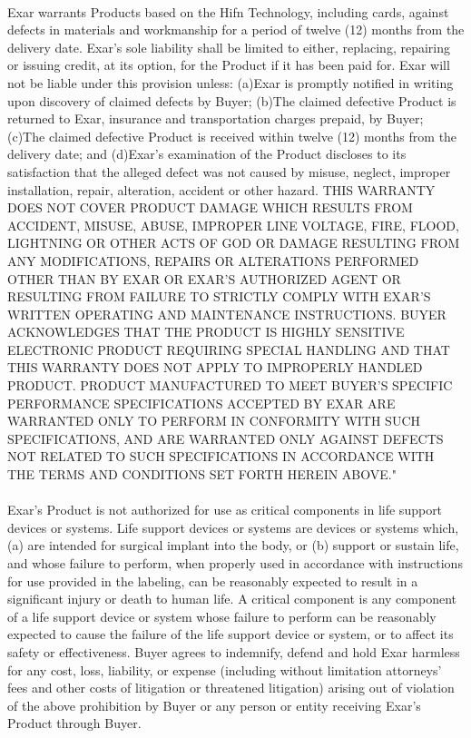 {  \noindent{\small\textbf{\textcolor{ThemeColor}{Limited Warranty}}}\\[.5ex]

  {\scriptsize\noindent{}Exar warrants Products based on the Hifn Technology, including cards,
  against defects in materials and workmanship for a period of twelve
  (12) months from the delivery date. Exar's sole liability shall be
  limited to either, replacing, repairing or issuing credit, at its
  option, for the Product if it has been paid for.  Exar will not be
  liable under this provision unless: (a)Exar is promptly notified in
  writing upon discovery of claimed defects by Buyer; (b)The claimed
  defective Product is returned to Exar, insurance and transportation
  charges prepaid, by Buyer; (c)The claimed defective Product is
  received within twelve (12) months from the delivery date; and
  (d)Exar's examination of the Product discloses to its satisfaction
  that the alleged defect was not caused by misuse, neglect, improper
  installation, repair, alteration, accident or other hazard. THIS
  WARRANTY DOES NOT COVER PRODUCT DAMAGE WHICH RESULTS FROM ACCIDENT,
  MISUSE, ABUSE, IMPROPER LINE VOLTAGE, FIRE, FLOOD, LIGHTNING OR OTHER
  ACTS OF GOD OR DAMAGE RESULTING FROM ANY MODIFICATIONS, REPAIRS OR
  ALTERATIONS PERFORMED OTHER THAN BY EXAR OR EXAR'S AUTHORIZED AGENT OR
  RESULTING FROM FAILURE TO STRICTLY COMPLY WITH EXAR'S WRITTEN
  OPERATING AND MAINTENANCE INSTRUCTIONS.  BUYER ACKNOWLEDGES THAT THE
  PRODUCT IS HIGHLY SENSITIVE ELECTRONIC PRODUCT REQUIRING SPECIAL
  HANDLING AND THAT THIS WARRANTY DOES NOT APPLY TO IMPROPERLY HANDLED
  PRODUCT.  PRODUCT MANUFACTURED TO MEET BUYER'S SPECIFIC PERFORMANCE
  SPECIFICATIONS ACCEPTED BY EXAR ARE WARRANTED ONLY TO PERFORM IN
  CONFORMITY WITH SUCH SPECIFICATIONS, AND ARE WARRANTED ONLY AGAINST
  DEFECTS NOT RELATED TO SUCH SPECIFICATIONS IN ACCORDANCE WITH THE
  TERMS AND CONDITIONS SET FORTH HEREIN ABOVE."}\\[.5ex]

  \noindent{\small\textbf{\textcolor{ThemeColor}{Life Support Policy}}}\\[.5ex]

  {\scriptsize\noindent{}Exar's Product is not authorized for use as critical components in
  life support devices or systems.  Life support devices or systems are
  devices or systems which, (a) are intended for surgical implant into
  the body, or (b) support or sustain life, and whose failure to
  perform, when properly used in accordance with instructions for use
  provided in the labeling, can be reasonably expected to result in a
  significant injury or death to human life. A critical component is any
  component of a life support device or system whose failure to perform
  can be reasonably expected to cause the failure of the life support
  device or system, or to affect its safety or effectiveness.  Buyer
  agrees to indemnify, defend and hold Exar harmless for any cost, loss,
  liability, or expense (including without limitation attorneys' fees
  and other costs of litigation or threatened litigation) arising out of
  violation of the above prohibition by Buyer or any person or entity
  receiving Exar's Product through Buyer.}\\[.5ex]

}
